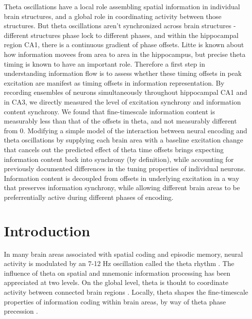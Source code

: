 \documentclass[10pt]{article}
\begin{document}
Theta oscillations have a local role assembling spatial information in individual brain structures, and a global role in coordinating activity between those structures.  But theta oscillations aren't synchronized across brain structures - different structures phase lock to different phases, and within the hippocampal region CA1, there is a continuous gradient of phase offsets.  Litte is known about how information movees from area to area in the hippocampus, but precise theta timing is known to have an important role.  Therefore a first step in understanding information flow is to assess whether these timing offsets in peak excitation are manifest as timing offsets in information representation.  By recording ensembles of neurons simultaneously throughout hippocampal CA1 and in CA3, we directly measured the level of excitation synchrony and information content synchrony.  We found that fine-timescale information content is measurably less than that of the offsets in theta, and not measurably different from 0.  Modifying a simple model of the interaction between neural encoding and theta oscillations by supplying each brain area with a baseline excitation change that cancels out the predicted effect of theta time offsets brings expecting information content back into synchrony (by definition), while accounting for previously documented differences in the tuning properties of individual neurons.  Information content is decoupled from offsets in underlying excitation in a way that preserves information synchrony, while allowing different brain areas to be preferrentially active during different phases of encoding.

\section*{Introduction}
In many brain areas associated with spatial coding and episodic memory, neural activity is modulated by an 7-12 Hz oscillation called the theta rhythm \cite{vanderwolf1969hippocampal, buzsaki2002theta}.  The influence of theta on spatial and mnemonic information processing has been appreciated at two levels. On the global level, theta is thouht to coordinate activity between connected brain regions \cite{Siapas2006, Jones2006, Serota2010, Colgin2011}. Locally, theta shapes the fine-timescale properties of information coding within brain areas, by way of theta phase precession \cite{Recce1993,Skaggs1996,Mehta2002,Dragoi2006, Leutgeb2010}.
\end{document}
